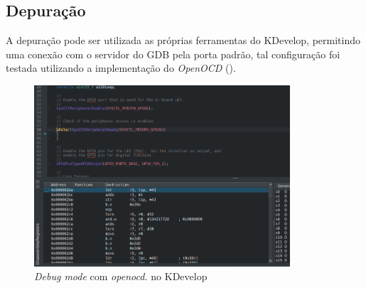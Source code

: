 \subsection{Depuração}

A depuração pode ser utilizada as próprias ferramentas do KDevelop, permitindo uma conexão com o servidor do GDB pela porta padrão, tal configuração foi testada utilizando a implementação do \textit{OpenOCD} ().

\begin{figure}[!htb]
  \centering
  \includegraphics[width=0.85\textwidth]{figuras/DEBUG.png}
  \caption[\textit{Debug mode} com \textit{openocd} no KDevelop]{\textit{Debug mode} com \textit{openocd.} no KDevelop}
  \label{fig:openocddebug}
\end{figure}
